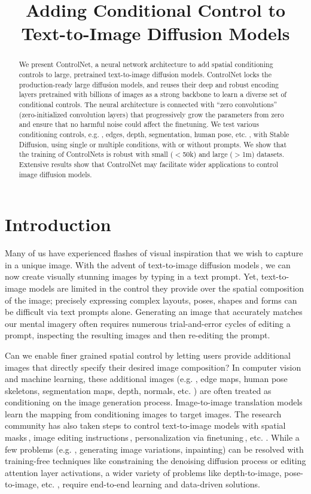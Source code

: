 \title{Adding Conditional Control to Text-to-Image Diffusion Models}

\begin{abstract}
We present ControlNet, a neural network architecture to add spatial conditioning controls to large, pretrained text-to-image diffusion models. ControlNet locks the production-ready large diffusion models, and reuses their deep and robust encoding layers pretrained with billions of images as a strong backbone to learn a diverse set of conditional controls. The neural architecture is connected with ``zero convolutions'' (zero-initialized convolution layers) that progressively grow the parameters from zero and ensure that no harmful noise could affect the finetuning. We test various conditioning controls, e.g. , edges, depth, segmentation, human pose, etc. , with Stable Diffusion, using single or multiple conditions, with or without prompts. We show that the training of ControlNets is robust with small ($<$50k) and large ($>$1m) datasets. Extensive results show that ControlNet may facilitate wider applications to control image diffusion models.
\end{abstract}

\section{Introduction}
	\label{sec:intro}
	Many of us have experienced flashes of visual inspiration that we wish to capture in a unique image.  With the advent of text-to-image diffusion
	models\,\cite{midjourney,DALLE2,rombach2021highresolution}, we can now create visually stunning images by typing in a text prompt. Yet, text-to-image models are limited in the control they provide over the spatial composition of the image; precisely expressing complex layouts, poses, shapes and forms can be difficult via text prompts alone. Generating an image that accurately matches our mental imagery often requires numerous trial-and-error cycles of editing a prompt, inspecting the resulting images and then re-editing the prompt.

	Can we enable finer grained spatial control by letting users provide additional images that directly specify their desired image composition? In computer vision and machine learning, these additional images (e.g. , edge maps, human pose skeletons, segmentation maps, depth, normals, etc. ) are often treated as conditioning on the image generation process.  Image-to-image translation
	models\,\cite{isola2017image,CycleGAN2017} learn the mapping from conditioning images to target images.  The research community has also taken steps to control text-to-image models with spatial masks\,\cite{avrahami2022spatext,gafni2022make},
	image editing instructions\,\cite{brooks2022instructpix2pix},
	personalization via
	finetuning\,\cite{gal2022image,ruiz2022dreambooth}, etc. . While a few problems (e.g. , generating image variations, inpainting) can be resolved with training-free techniques like constraining the denoising diffusion process or editing attention layer activations, a wider variety of problems like depth-to-image, pose-to-image, etc. , require end-to-end learning and data-driven solutions.


